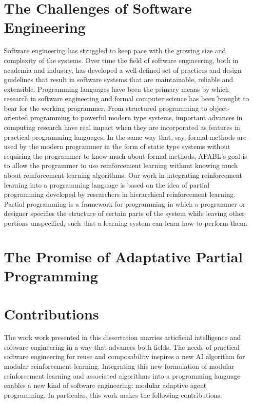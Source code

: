 \section{The Challenges of Software Engineering}

Software engineering has struggled to keep pace with the growing size and complexity of the systems. Over time the field of software engineering, both in academia and industry, has developed a well-defined set of practices and design guidelines that result in software systems that are maintainable, reliable and extensible. Programming languages have been the primary means by which research in software engineering and formal computer science has been brought to bear for the working programmer. From structured programming to object-oriented programming to powerful modern type systems, important advances in computing research have real impact when they are incorporated as features in practical programming languages. In the same way that, say, formal methods are used by the modern programmer in the form of static type systems without requiring the programmer to know much about formal methods, AFABL's goal is to allow the programmer to use reinforcement learning without knowing much about reinforcement learning algorithms. Our work in integrating reinforcement learning into a programming language is based on the idea of partial programming developed by researchers in hierarchical reinforcement learning. Partial programming is a framework for programming in which a programmer or designer specifies the structure of certain parts of the system while leaving other portions unspecified, such that a learning system can learn how to perform them.

\section{The Promise of Adaptative Partial Programming}



\section{Contributions}

The work work presented in this dissertation marries articficial intelligence and software engineering in a way that advances both fields. The needs of practical software engineering for reuse and composability inspires a new AI algorithm for modular reinforcement learning. Integrating this new formulation of modular reinforcement learning and associated algorithms into a programming language enables a new kind of software engineering: modular adaptive agent programming. In particular, this work makes the following contributions:

